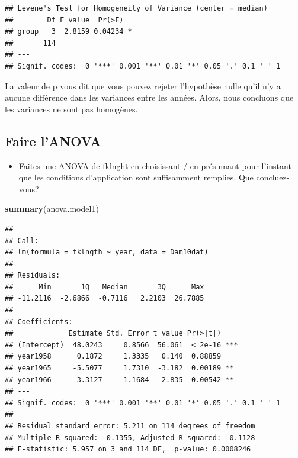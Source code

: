 \documentclass[12pt,]{book}
\newenvironment{Shaded}{\begin{snugshade}}{\end{snugshade}}
\newcommand{\KeywordTok}[1]{\textcolor[rgb]{0.27,0.27,0.27}{\textbf{#1}}}
\newcommand{\NormalTok}[1]{#1}
\providecommand{\tightlist}{%
  \setlength{\itemsep}{0pt}\setlength{\parskip}{0pt}}
\begin{document}
\begin{verbatim}
## Levene's Test for Homogeneity of Variance (center = median)
##        Df F value  Pr(>F)  
## group   3  2.8159 0.04234 *
##       114                  
## ---
## Signif. codes:  0 '***' 0.001 '**' 0.01 '*' 0.05 '.' 0.1 ' ' 1
\end{verbatim}

La valeur de p vous dit que vous pouvez rejeter l'hypothèse nulle qu'il n'y a aucune différence dans les variances entre les années. Alors, nous concluons que les variances ne sont pas homogènes.

\hypertarget{faire-lanova}{%
\subsection{Faire l'ANOVA}\label{faire-lanova}}

\begin{itemize}
\tightlist
\item
  Faites une ANOVA de fklnght en choisissant / en présumant pour l'instant que les conditions d'application sont suffisamment remplies. Que concluez-vous?
\end{itemize}

\begin{Shaded}
\begin{Highlighting}[]
\KeywordTok{summary}\NormalTok{(anova.model1)}
\end{Highlighting}
\end{Shaded}

\begin{verbatim}
## 
## Call:
## lm(formula = fklngth ~ year, data = Dam10dat)
## 
## Residuals:
##      Min       1Q   Median       3Q      Max 
## -11.2116  -2.6866  -0.7116   2.2103  26.7885 
## 
## Coefficients:
##             Estimate Std. Error t value Pr(>|t|)    
## (Intercept)  48.0243     0.8566  56.061  < 2e-16 ***
## year1958      0.1872     1.3335   0.140  0.88859    
## year1965     -5.5077     1.7310  -3.182  0.00189 ** 
## year1966     -3.3127     1.1684  -2.835  0.00542 ** 
## ---
## Signif. codes:  0 '***' 0.001 '**' 0.01 '*' 0.05 '.' 0.1 ' ' 1
## 
## Residual standard error: 5.211 on 114 degrees of freedom
## Multiple R-squared:  0.1355,	Adjusted R-squared:  0.1128 
## F-statistic: 5.957 on 3 and 114 DF,  p-value: 0.0008246
\end{verbatim}
\end{document}
